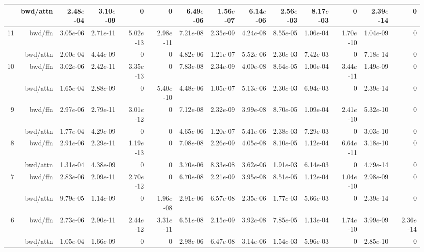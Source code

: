 \begin{table*}[t]
\begin{center}
\begin{tiny}
\begin{sc}
\begin{tabular}{rrrrrrrrrrrrrr}
              & bwd/attn  & 2.48$e$-04 & 3.10$e$-09 & 0 & 0 & 6.49$e$-06 & 1.56$e$-07 & 6.14$e$-06 & 2.56$e$-03 & 8.17$e$-03 & 0 & 2.39$e$-14 & 0 \\
\midrule
\multirow{2}{*}{11}             & bwd/ffn   & 3.05$e$-06 & 2.71$e$-11 & 5.02$e$-13 & 2.98$e$-11 & 7.21$e$-08 & 2.35$e$-09 & 4.24$e$-08 & 8.55$e$-05 & 1.06$e$-04 & 1.70$e$-10 & 1.04$e$-09 & 0 \\
              & bwd/attn  & 2.00$e$-04 & 4.44$e$-09 & 0 & 0 & 4.82$e$-06 & 1.21$e$-07 & 5.52$e$-06 & 2.30$e$-03 & 7.42$e$-03 & 0 & 7.18$e$-14 & 0 \\
\midrule
\multirow{2}{*}{10}             & bwd/ffn   & 3.02$e$-06 & 2.42$e$-11 & 3.35$e$-13 & 0 & 7.83$e$-08 & 2.34$e$-09 & 4.00$e$-08 & 8.64$e$-05 & 1.00$e$-04 & 3.44$e$-11 & 1.49$e$-09 & 0 \\
              & bwd/attn  & 1.65$e$-04 & 2.88$e$-09 & 0 & 5.40$e$-10 & 4.48$e$-06 & 1.05$e$-07 & 5.13$e$-06 & 2.30$e$-03 & 6.94$e$-03 & 0 & 2.39$e$-14 & 0 \\
\midrule
\multirow{2}{*}{9}             & bwd/ffn   & 2.97$e$-06 & 2.79$e$-11 & 3.01$e$-12 & 0 & 7.12$e$-08 & 2.32$e$-09 & 3.99$e$-08 & 8.70$e$-05 & 1.09$e$-04 & 2.41$e$-10 & 5.32$e$-10 & 0 \\
              & bwd/attn  & 1.77$e$-04 & 4.29$e$-09 & 0 & 0 & 4.65$e$-06 & 1.20$e$-07 & 5.41$e$-06 & 2.38$e$-03 & 7.29$e$-03 & 0 & 3.03$e$-10 & 0 \\
\midrule
\multirow{2}{*}{8}             & bwd/ffn   & 2.91$e$-06 & 2.29$e$-11 & 1.19$e$-13 & 0 & 7.08$e$-08 & 2.26$e$-09 & 4.05$e$-08 & 8.10$e$-05 & 1.12$e$-04 & 6.64$e$-11 & 3.18$e$-10 & 0 \\
              & bwd/attn  & 1.31$e$-04 & 4.38$e$-09 & 0 & 0 & 3.70$e$-06 & 8.33$e$-08 & 3.62$e$-06 & 1.91$e$-03 & 6.14$e$-03 & 0 & 4.79$e$-14 & 0 \\
\midrule
\multirow{2}{*}{7}             & bwd/ffn   & 2.83$e$-06 & 2.09$e$-11 & 2.70$e$-12 & 0 & 6.70$e$-08 & 2.21$e$-09 & 3.95$e$-08 & 8.51$e$-05 & 1.12$e$-04 & 1.04$e$-10 & 2.98$e$-09 & 0 \\
              & bwd/attn  & 9.79$e$-05 & 1.14$e$-09 & 0 & 1.96$e$-08 & 2.91$e$-06 & 6.57$e$-08 & 2.35$e$-06 & 1.77$e$-03 & 5.66$e$-03 & 0 & 2.39$e$-14 & 0 \\
\midrule
\multirow{2}{*}{6}             & bwd/ffn   & 2.73$e$-06 & 2.90$e$-11 & 2.44$e$-12 & 3.31$e$-11 & 6.51$e$-08 & 2.15$e$-09 & 3.92$e$-08 & 7.85$e$-05 & 1.13$e$-04 & 1.74$e$-10 & 3.99$e$-09 & 2.36$e$-14 \\
              & bwd/attn  & 1.05$e$-04 & 1.66$e$-09 & 0 & 0 & 2.98$e$-06 & 6.47$e$-08 & 3.14$e$-06 & 1.54$e$-03 & 5.96$e$-03 & 0 & 2.85$e$-10 & 0 \\

\end{tabular}
\end{sc}
\end{tiny}
\end{center}
\end{table*}
